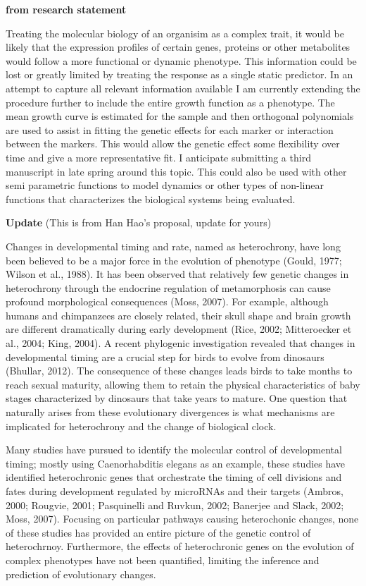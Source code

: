 \documentclass[]{book}
\theoremstyle{definition}
\theoremstyle{definition}
\theoremstyle{remark}
\begin{document}
\textbf{from research statement}

Treating the molecular biology of an organisim as a complex trait, it
would be likely that the expression profiles of certain genes, proteins
or other metabolites would follow a more functional or dynamic
phenotype. This information could be lost or greatly limited by treating
the response as a single static predictor. In an attempt to capture all
relevant information available I am currently extending the procedure
further to include the entire growth function as a phenotype. The mean
growth curve is estimated for the sample and then orthogonal polynomials
are used to assist in fitting the genetic effects for each marker or
interaction between the markers. This would allow the genetic effect
some flexibility over time and give a more representative fit. I
anticipate submitting a third manuscript in late spring around this
topic. This could also be used with other semi parametric functions to
model dynamics or other types of non-linear functions that characterizes
the biological systems being evaluated.

\textbf{Update} (This is from Han Hao's proposal, update for yours)

Changes in developmental timing and rate, named as heterochrony, have
long been believed to be a major force in the evolution of phenotype
(Gould, 1977; Wilson et al., 1988). It has been observed that relatively
few genetic changes in heterochrony through the endocrine regulation of
metamorphosis can cause profound morphological consequences (Moss,
2007). For example, although humans and chimpanzees are closely related,
their skull shape and brain growth are different dramatically during
early development (Rice, 2002; Mitteroecker et al., 2004; King, 2004). A
recent phylogenic investigation revealed that changes in developmental
timing are a crucial step for birds to evolve from dinosaurs (Bhullar,
2012). The consequence of these changes leads birds to take months to
reach sexual maturity, allowing them to retain the physical
characteristics of baby stages characterized by dinosaurs that take
years to mature. One question that naturally arises from these
evolutionary divergences is what mechanisms are implicated for
heterochrony and the change of biological clock.

Many studies have pursued to identify the molecular control of
developmental timing; mostly using Caenorhabditis elegans as an example,
these studies have identified heterochronic genes that orchestrate the
timing of cell divisions and fates during development regulated by
microRNAs and their targets (Ambros, 2000; Rougvie, 2001; Pasquinelli
and Ruvkun, 2002; Banerjee and Slack, 2002; Moss, 2007). Focusing on
particular pathways causing heterochonic changes, none of these studies
has provided an entire picture of the genetic control of heterochrnoy.
Furthermore, the effects of heterochronic genes on the evolution of
complex phenotypes have not been quantified, limiting the inference and
prediction of evolutionary changes.
\end{document}
